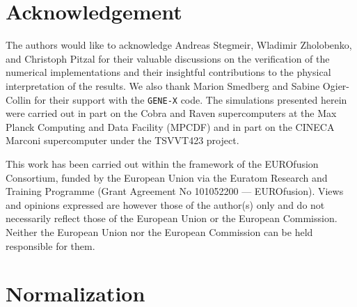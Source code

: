 \documentclass[preprint,12pt]{elsarticle}
\begin{document}

\section*{Acknowledgement}

The authors would like to acknowledge Andreas Stegmeir, Wladimir Zholobenko, and Christoph Pitzal for their valuable discussions on the verification of the numerical implementations and their insightful contributions to the physical interpretation of the results. We also thank Marion Smedberg and Sabine Ogier-Collin for their support with the \verb|GENE-X| code. The simulations presented herein were carried out in part on the Cobra and Raven supercomputers at the Max Planck Computing and Data Facility (MPCDF) and in part on the CINECA Marconi supercomputer under the TSVVT423 project.

This work has been carried out within the framework of the EUROfusion Consortium, funded by the European Union via the Euratom Research and Training Programme (Grant Agreement No 101052200 — EUROfusion). Views and opinions expressed are however those of the author(s) only and do not necessarily reflect those of the European Union or the European Commission. Neither the European Union nor the European Commission can be held responsible for them.


\appendix

\section{Normalization}
\label{appendix:normalization}
\end{document}
